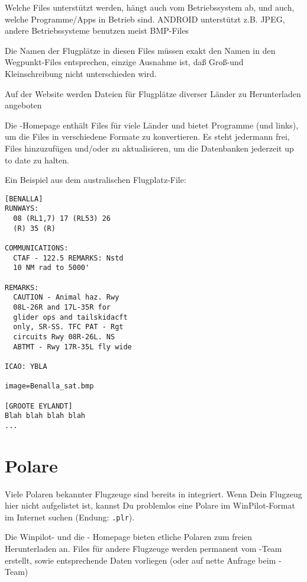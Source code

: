 
Welche Files unterstützt werden, hängt auch vom Betriebssystem ab, und auch, welche Programme/Apps
in Betrieb sind. ANDROID unterstützt z.B.  JPEG, andere Betriebssysteme benutzen meist BMP-Files

Die Namen der Flugplätze in diesen Files müssen exakt den Namen in den Wegpunkt-Files entsprechen,
einzige Ausnahme ist, daß Groß-und Kleinschreibung nicht unterschieden wird.

Auf der \xc Website werden Dateien für Flugplätze diverser Länder zu Herunterladen angeboten


Die \xc-Homepage enthält Files für viele Länder und bietet Programme (und links), um die
Files in verschiedene Formate zu konvertieren.  Es steht jedermann frei, Files hinzuzufügen und/oder zu aktualisieren,
um die Datenbanken jederzeit up to date zu halten.

Ein Beispiel aus dem australischen Flugplatz-File:
\begin{verbatim}
[BENALLA]
RUNWAYS:
  08 (RL1,7) 17 (RL53) 26
  (R) 35 (R)

COMMUNICATIONS:
  CTAF - 122.5 REMARKS: Nstd
  10 NM rad to 5000'

REMARKS:
  CAUTION - Animal haz. Rwy
  08L-26R and 17L-35R for
  glider ops and tailskidacft
  only, SR-SS. TFC PAT - Rgt
  circuits Rwy 08R-26L. NS
  ABTMT - Rwy 17R-35L fly wide

ICAO: YBLA

image=Benalla_sat.bmp

[GROOTE EYLANDT]
Blah blah blah blah
...
\end{verbatim}

\section{Polare}\label{sec:glide-polar}

Viele Polaren bekannter Flugzeuge sind bereits in \xc integriert.  Wenn Dein Flugzeug  hier nicht
aufgelistet ist, kannst Du problemlos eine Polare im {\sc WinPilot}-Format im Internet suchen (Endung:
\verb|.plr|).

Die Winpilot- und die \xc - Homepage bieten etliche Polaren zum freien Herunterladen an. Files für
andere Flugzeuge werden permanent vom \xc-Team erstellt, sowie entsprechende Daten vorliegen (oder
auf nette Anfrage beim \xc-Team)

